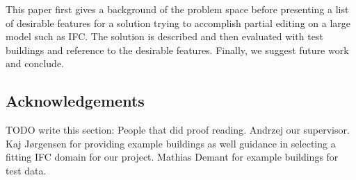 This paper first gives a background of the problem space before presenting a list of desirable features for a solution trying to accomplish partial editing on a large model such as IFC. The solution is described and then evaluated with test buildings and reference to the desirable features. Finally, we suggest future work and conclude.

\subsection{Acknowledgements}
TODO write this section: People that did proof reading. Andrzej our supervisor. Kaj Jørgensen for providing example buildings as well guidance in selecting a fitting IFC domain for our project. Mathias Demant for example buildings for test data.


